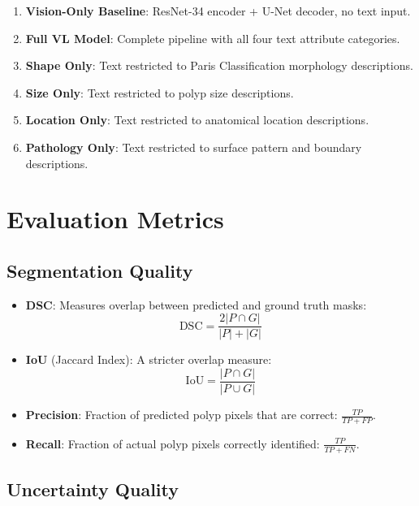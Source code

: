 \begin{enumerate}
	\item \textbf{Vision-Only Baseline}: ResNet-34 encoder + U-Net decoder, no text input.
	\item \textbf{Full VL Model}: Complete pipeline with all four text attribute categories.
	\item \textbf{Shape Only}: Text restricted to Paris Classification morphology descriptions.
	\item \textbf{Size Only}: Text restricted to polyp size descriptions.
	\item \textbf{Location Only}: Text restricted to anatomical location descriptions.
	\item \textbf{Pathology Only}: Text restricted to surface pattern and boundary descriptions.
\end{enumerate}


\section{Evaluation Metrics}
\label{sec:eval:metrics}

\subsection{Segmentation Quality}
\label{sec:eval:seg_metrics}

\begin{itemize}
	\item \textbf{\ac{DSC}}: Measures overlap between predicted and ground truth masks:
	\begin{equation}
		\text{DSC} = \frac{2|P \cap G|}{|P| + |G|}
	\end{equation}
	
	\item \textbf{\ac{IoU}} (Jaccard Index): A stricter overlap measure:
	\begin{equation}
		\text{IoU} = \frac{|P \cap G|}{|P \cup G|}
	\end{equation}
	
	\item \textbf{Precision}: Fraction of predicted polyp pixels that are correct: $\frac{TP}{TP + FP}$.
	
	\item \textbf{Recall}: Fraction of actual polyp pixels correctly identified: $\frac{TP}{TP + FN}$.
\end{itemize}

\subsection{Uncertainty Quality}
\label{sec:eval:unc_metrics}

